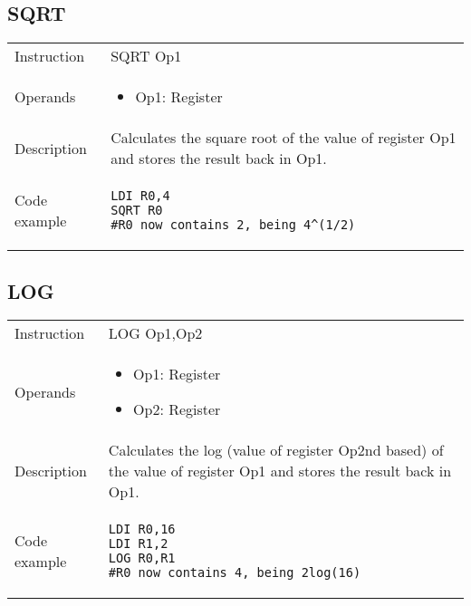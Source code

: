 \subsection{SQRT}
\renewcommand*{\arraystretch}{2.0}
\begin{longtable}{P{3cm}P{9cm}}
\midrule
\noindent Instruction & SQRT Op1 \\
\noindent Operands &
\begin{itemize}[label={},noitemsep,leftmargin=*,topsep=0pt,partopsep=0pt, itemsep=1em]
\item Op1: Register
\end{itemize}\\
\noindent Description & Calculates the square root of the value of register Op1 and stores the result back in Op1.
	 \\
\noindent Code example & 
\begin{lstlisting}
LDI R0,4
SQRT R0
#R0 now contains 2, being 4^(1/2)
\end{lstlisting} \\
\end{longtable}

\newpage

\subsection{LOG}
\renewcommand*{\arraystretch}{2.0}
\begin{longtable}{P{3cm}P{9cm}}
\midrule
\noindent Instruction & LOG Op1,Op2 \\
\noindent Operands &
\begin{itemize}[label={},noitemsep,leftmargin=*,topsep=0pt,partopsep=0pt, itemsep=1em]
\item Op1: Register
\item Op2: Register
\end{itemize}\\
\noindent Description & Calculates the log (value of register Op2nd based) of the value of register Op1 and stores the result back in Op1.
	 \\
\noindent Code example & 
\begin{lstlisting}
LDI R0,16
LDI R1,2
LOG R0,R1
#R0 now contains 4, being 2log(16)
\end{lstlisting} \\
\end{longtable}


